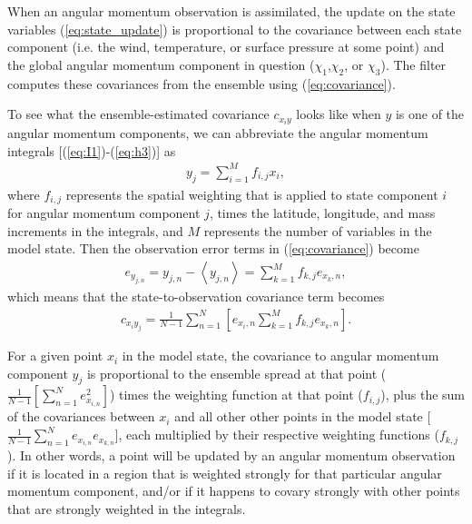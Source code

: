 When an angular momentum observation is assimilated, the update on the state variables (\ref{eq:state_update}) is proportional to the covariance between each state component (i.e. the wind, temperature, or surface pressure at some point) and the global angular momentum component in question ($\chi_1$,$\chi_2$, or $\chi_3$). 
The filter computes these covariances from the ensemble using (\ref{eq:covariance}).


To see what the ensemble-estimated covariance $c_{x_i y}$ looks like when $y$ is one of the angular momentum components, we can abbreviate the angular momentum integrals [(\ref{eq:I1})-(\ref{eq:h3})] as
%
\begin{eqnarray}
y_j = \sum_{i=1}^M f_{i,j} x_i,
\end{eqnarray}
%
where $f_{i,j}$ represents the spatial weighting that is applied to state component $i$ for angular momentum component $j$, times the latitude, longitude, and mass increments in the integrals, and $M$ represents the number of variables in the model state.
Then the observation error terms in (\ref{eq:covariance}) become
\begin{eqnarray}
	e_{y_{j,n}} = y_{j,n} - \left< y_{j,n} \right>
		= \sum_{k=1}^{M}f_{k,j}e_{x_k,n},
\end{eqnarray}
which means that the state-to-observation covariance term becomes
\begin{eqnarray}
	c_{x_i y_j} = \frac{1}{N-1}
	\sum_{n=1}^{N}
	\left[
	e_{x_i,n}
	\sum_{k=1}^{M} f_{k,j}e_{x_k,n}
	\right].
	\label{eq:state_to_obs_covariance}
\end{eqnarray}

For a given point $x_i$ in the model state, the covariance to angular momentum component $y_j$ is proportional to the ensemble spread at that point ($\frac{1}{N-1}\left[\sum_{n=1}^N  e_{x_{i,n}} ^2 \right]$) times the weighting function at that point ($f_{i,j}$), plus the sum of the covariances between $x_i$ and all other other points in the model state [$\frac{1}{N-1}\sum_{n=1}^N e_{x_{i,n}} e_{x_{k,n}}$], each multiplied by their respective weighting functions ($f_{k,j}$). 
In other words, a point will be updated by an angular momentum observation if it is located in a region that is weighted strongly for that particular angular momentum component, and/or if it happens to covary strongly with other points that are strongly weighted in the integrals.  

